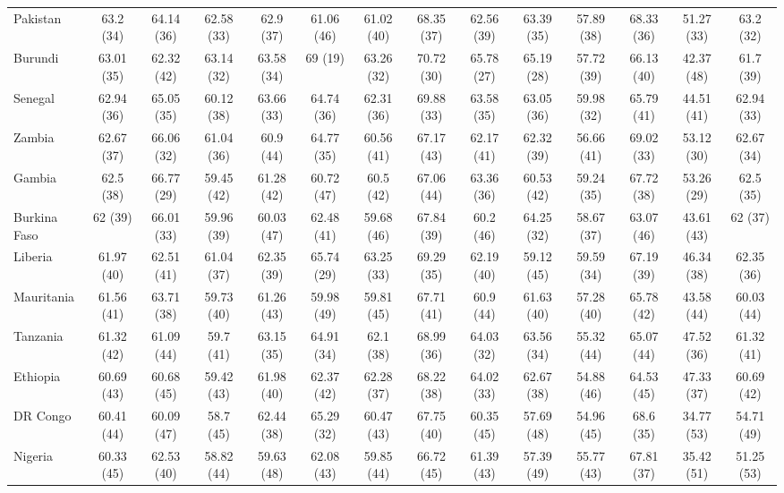 {\begin{longtable}{lccccccccccccc}
Pakistan & 63.2 (34) & 64.14 (36) & 62.58 (33) & 62.9 (37) & 61.06 (46) & 61.02 (40) & 68.35 (37) & 62.56 (39) & 63.39 (35) & 57.89 (38) & 68.33 (36) & 51.27 (33) & 63.2 (32) \\ 
Burundi & 63.01 (35) & 62.32 (42) & 63.14 (32) & 63.58 (34) & 69 (19) & 63.26 (32) & 70.72 (30) & 65.78 (27) & 65.19 (28) & 57.72 (39) & 66.13 (40) & 42.37 (48) & 61.7 (39) \\ 
Senegal & 62.94 (36) & 65.05 (35) & 60.12 (38) & 63.66 (33) & 64.74 (36) & 62.31 (36) & 69.88 (33) & 63.58 (35) & 63.05 (36) & 59.98 (32) & 65.79 (41) & 44.51 (41) & 62.94 (33) \\ 
Zambia & 62.67 (37) & 66.06 (32) & 61.04 (36) & 60.9 (44) & 64.77 (35) & 60.56 (41) & 67.17 (43) & 62.17 (41) & 62.32 (39) & 56.66 (41) & 69.02 (33) & 53.12 (30) & 62.67 (34) \\ 
Gambia & 62.5 (38) & 66.77 (29) & 59.45 (42) & 61.28 (42) & 60.72 (47) & 60.5 (42) & 67.06 (44) & 63.36 (36) & 60.53 (42) & 59.24 (35) & 67.72 (38) & 53.26 (29) & 62.5 (35) \\ 
Burkina Faso & 62 (39) & 66.01 (33) & 59.96 (39) & 60.03 (47) & 62.48 (41) & 59.68 (46) & 67.84 (39) & 60.2 (46) & 64.25 (32) & 58.67 (37) & 63.07 (46) & 43.61 (43) & 62 (37) \\ 
Liberia & 61.97 (40) & 62.51 (41) & 61.04 (37) & 62.35 (39) & 65.74 (29) & 63.25 (33) & 69.29 (35) & 62.19 (40) & 59.12 (45) & 59.59 (34) & 67.19 (39) & 46.34 (38) & 62.35 (36) \\ 
Mauritania & 61.56 (41) & 63.71 (38) & 59.73 (40) & 61.26 (43) & 59.98 (49) & 59.81 (45) & 67.71 (41) & 60.9 (44) & 61.63 (40) & 57.28 (40) & 65.78 (42) & 43.58 (44) & 60.03 (44) \\ 
Tanzania & 61.32 (42) & 61.09 (44) & 59.7 (41) & 63.15 (35) & 64.91 (34) & 62.1 (38) & 68.99 (36) & 64.03 (32) & 63.56 (34) & 55.32 (44) & 65.07 (44) & 47.52 (36) & 61.32 (41) \\ 
Ethiopia & 60.69 (43) & 60.68 (45) & 59.42 (43) & 61.98 (40) & 62.37 (42) & 62.28 (37) & 68.22 (38) & 64.02 (33) & 62.67 (38) & 54.88 (46) & 64.53 (45) & 47.33 (37) & 60.69 (42) \\ 
DR Congo & 60.41 (44) & 60.09 (47) & 58.7 (45) & 62.44 (38) & 65.29 (32) & 60.47 (43) & 67.75 (40) & 60.35 (45) & 57.69 (48) & 54.96 (45) & 68.6 (35) & 34.77 (53) & 54.71 (49) \\ 
Nigeria & 60.33 (45) & 62.53 (40) & 58.82 (44) & 59.63 (48) & 62.08 (43) & 59.85 (44) & 66.72 (45) & 61.39 (43) & 57.39 (49) & 55.77 (43) & 67.81 (37) & 35.42 (51) & 51.25 (53) \\ 

\end{longtable}}
